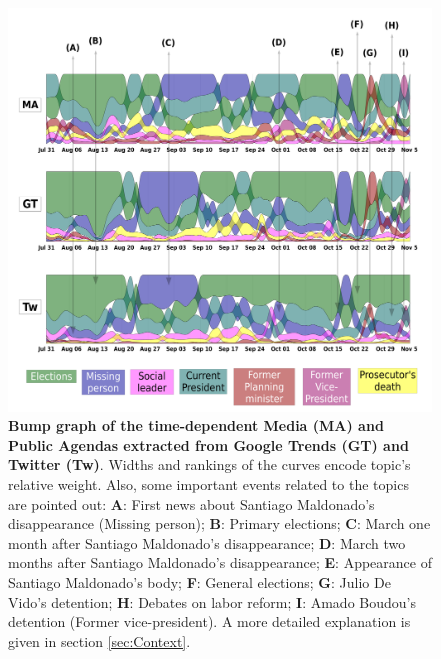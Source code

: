 \documentclass{bmcart}
\begin{document}
\begin{backmatter}
\begin{figure}[h!]
\includegraphics[width = \textwidth]{Fig2.pdf}
\caption{\textbf{Bump graph of the time-dependent Media (MA) and Public Agendas extracted from Google Trends (GT) and Twitter (Tw)}. Widths and rankings of the curves encode topic's relative weight. Also, some important events related to the topics are pointed out:
\textbf{A}: First news about Santiago Maldonado's disappearance (Missing person);
\textbf{B}: Primary elections;
\textbf{C}: March one month after Santiago Maldonado's disappearance;
\textbf{D}: March two months after Santiago Maldonado's disappearance;
\textbf{E}: Appearance of Santiago Maldonado's body;
\textbf{F}: General elections;
\textbf{G}: Julio De Vido's detention;
\textbf{H}: Debates on labor reform;
\textbf{I}: Amado Boudou's detention (Former vice-president).
A more detailed explanation is given in section \ref{sec:Context}.}
\label{fig:all_agenda}
\end{figure}


\end{backmatter}
\end{document}
